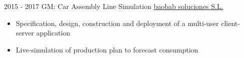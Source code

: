 \documentclass[letterpaper]{twentysecondcv} %
\begin{document}
\begin{twenty}
  \twentyitem
      {2015 - 2017}
    {}
        {GM: Car Assembly Line Simulation}
        {\href{https://baobabsoluciones.es/en/}{baobab soluciones S.L.}}
        {}
        {
        {\begin{itemize}
        \item Specification, design, construction and deployment of a multi-user client-server application
        \item Live-simulation of production plan to forecast consumption
        \vspace{2mm}
        \end{itemize}}
        }


\end{twenty}
\end{document}
